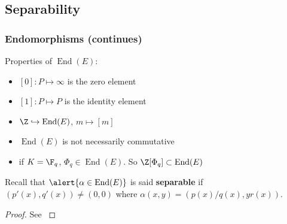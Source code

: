 \documentclass[10pt,handout]{beamer} %
\begin{document}
\subsection{Separability}
\begin{frame}
\frametitle{Endomorphisms (continues)}

\begin{block}{Properties of $\operatorname{End}(E)$:}
\begin{itemize}[<+-|alert@+>]
  \item \alert{$[0]:P\mapsto\infty$} is the zero element
  \item \alert{$[1]:P\mapsto P$} is the identity element
  \item \alert{$\Z\hookrightarrow\operatorname{End}(E)$}, $m\mapsto [m]$
  \item \alert{$\operatorname{End}(E)$} is not necessarily commutative
  \item if $K=\F_q$, \alert{$\Phi_q\in\operatorname{End}(E)$}. So \alert{$\Z[\Phi_q]\subset\operatorname{End}(E)$}
\end{itemize}\pause
\end{block}

Recall that $\alert{\alpha\in \operatorname{End}(E)}$ is said \textbf{separable}
 if $(p'(x),q'(x))\neq(0,0)$ where $\alpha(x,y)=(p(x)/q(x),yr(x))$.\pause

\pause

\begin{proof}
See \cite[Proposition 2.29]{washington}
\end{proof}

\end{frame}
\end{document}
